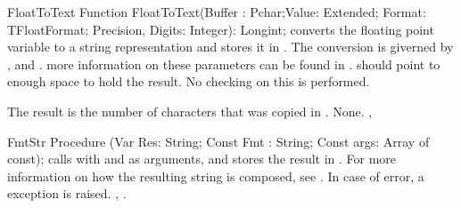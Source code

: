 

\begin{function}{FloatToText}
\Declaration
Function FloatToText(Buffer : Pchar;Value: Extended; Format: TFloatFormat; Precision, Digits: Integer): Longint;
\Description
{} converts the floating point variable  to a 
string representation and stores it in .  The conversion is
giverned by ,  and .
more information on these parameters can be found in .
 should point to enough space to hold the result. No checking on
this is performed.

The result is the number of characters that was copied in .
\Errors
None.
\SeeAlso
{}, 
\end{function}
 


\begin{procedure}{FmtStr}
\Declaration
Procedure (Var Res: String; Const Fmt : String; Const args: Array of const);
\Description
{} calls  with  and  as arguments,
and stores the result in . For more information on how the
resulting string is composed, see .
\Errors
In case of error, a  exception is raised.
\SeeAlso
{}, .
\end{procedure}




